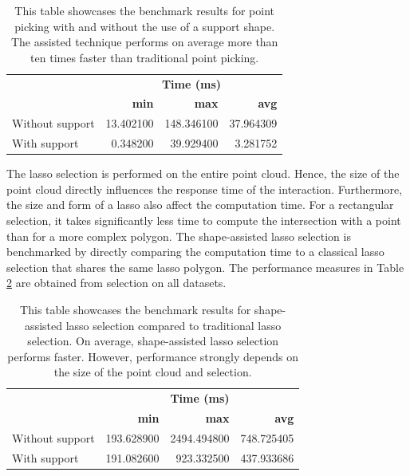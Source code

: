 \begin{table}[t]
\centering
\begin{tabular}{ l|r| r | r }
                       &\multicolumn{3}{c}{\textbf{Time (ms)}}\\
                       & \textbf{min}    & \textbf{max}    & \textbf{avg} \\
        \hline
        Without support& 13.402100  & 148.346100 & 37.964309 \\
        With support   &  0.348200  &  39.929400 &  3.281752 \\

\end{tabular}
\caption{This table showcases the benchmark results for point picking with and without the use of a support shape. The assisted technique performs on average more than ten times faster than traditional point picking. }
\label{tab:picking_performance}
\end{table}

The lasso selection is performed on the entire point cloud. Hence, the size of the point cloud directly influences the response time of the interaction. Furthermore, the size and form of a lasso also affect the computation time. For a rectangular selection, it takes significantly less time to compute the intersection with a point than for a more complex polygon. The shape-assisted lasso selection is benchmarked by directly comparing the computation time to a classical lasso selection that shares the same lasso polygon. The performance measures in Table \ref{tab:lasso_performance} are obtained from selection on all datasets.

\begin{table}
\centering
\begin{tabular}{ l | r | r | r }
                   & \multicolumn{3}{c}{\textbf{Time (ms)}}\\
                   & \textbf{min}    & \textbf{max}    & \textbf{avg} \\
        \hline
Without support    & 193.628900 & 2494.494800 & 748.725405 \\
With support       & 191.082600 & 923.332500 & 437.933686 \\

\end{tabular}
\caption{This table showcases the benchmark results for shape-assisted lasso selection compared to traditional lasso selection. On average, shape-assisted lasso selection performs faster. However, performance strongly depends on the size of the point cloud and selection. }
\label{tab:lasso_performance}
\end{table}

